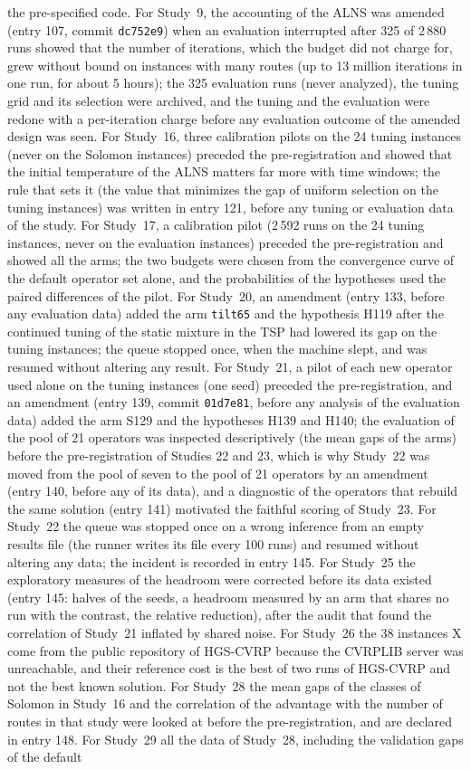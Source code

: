 \documentclass[11pt]{article}
\begin{document}
the pre-specified code. For Study~9, the accounting of the ALNS was amended (entry 107, commit \texttt{dc752e9}) when an evaluation interrupted after 325 of 2\,880 runs showed that the number of iterations, which the budget did not charge for, grew without bound on instances with many routes (up to 13 million iterations in one run, for about 5 hours); the 325 evaluation runs (never analyzed), the tuning grid and its selection were archived, and the tuning and the evaluation were redone with a per-iteration charge before any evaluation outcome of the amended design was seen. For Study~16, three calibration pilots on the 24 tuning instances (never on the Solomon instances) preceded the pre-registration and showed that the initial temperature of the ALNS matters far more with time windows; the rule that sets it (the value that minimizes the gap of uniform selection on the tuning instances) was written in entry 121, before any tuning or evaluation data of the study. For Study~17, a calibration pilot (2\,592 runs on the 24 tuning instances, never on the evaluation instances) preceded the pre-registration and showed all the arms; the two budgets were chosen from the convergence curve of the default operator set alone, and the probabilities of the hypotheses used the paired differences of the pilot. For Study~20, an amendment (entry 133, before any evaluation data) added the arm \texttt{tilt65} and the hypothesis H119 after the continued tuning of the static mixture in the TSP had lowered its gap on the tuning instances; the queue stopped once, when the machine slept, and was resumed without altering any result. For Study~21, a pilot of each new operator used alone on the tuning instances (one seed) preceded the pre-registration, and an amendment (entry 139, commit \texttt{01d7e81}, before any analysis of the evaluation data) added the arm S129 and the hypotheses H139 and H140; the evaluation of the pool of 21 operators was inspected descriptively (the mean gaps of the arms) before the pre-registration of Studies 22 and 23, which is why Study~22 was moved from the pool of seven to the pool of 21 operators by an amendment (entry 140, before any of its data), and a diagnostic of the operators that rebuild the same solution (entry 141) motivated the faithful scoring of Study~23. For Study~22 the queue was stopped once on a wrong inference from an empty results file (the runner writes its file every 100 runs) and resumed without altering any data; the incident is recorded in entry 145. For Study~25 the exploratory measures of the headroom were corrected before its data existed (entry 145: halves of the seeds, a headroom measured by an arm that shares no run with the contrast, the relative reduction), after the audit that found the correlation of Study~21 inflated by shared noise. For Study~26 the 38 instances X come from the public repository of HGS-CVRP because the CVRPLIB server was unreachable, and their reference cost is the best of two runs of HGS-CVRP and not the best known solution. For Study~28 the mean gaps of the classes of Solomon in Study~16 and the correlation of the advantage with the number of routes in that study were looked at before the pre-registration, and are declared in entry 148. For Study~29 all the data of Study~28, including the validation gaps of the default 
\end{document}
